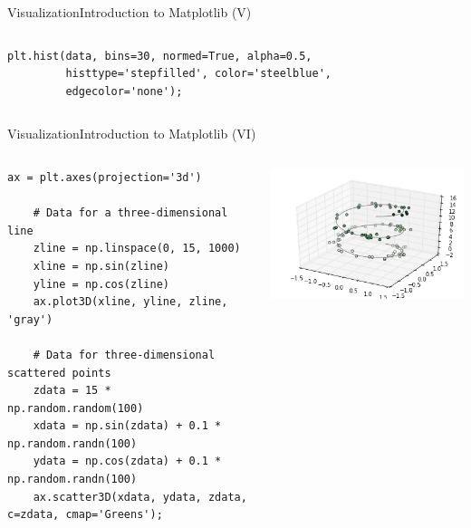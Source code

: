 \documentclass[10pt,compress]{beamer} %
\begin{document}
\begin{frame}[fragile]{Visualization}{Introduction to Matplotlib (V)}
\begin{columns}
\begin{exampleblock}{}
\begin{lstlisting}[basicstyle=\tiny]
	plt.hist(data, bins=30, normed=True, alpha=0.5,
         histtype='stepfilled', color='steelblue',
         edgecolor='none');
	\end{lstlisting}
	\vspace{-0.2cm} 
	\end{exampleblock}
	\end{columns}
\end{frame}

\begin{frame}[fragile]{Visualization}{Introduction to Matplotlib (VI)}
	\begin{columns}
	\begin{exampleblock}{}
	\vspace{-0.2cm} 
	\begin{lstlisting}[basicstyle=\tiny]
	ax = plt.axes(projection='3d')

	# Data for a three-dimensional line
	zline = np.linspace(0, 15, 1000)
	xline = np.sin(zline)
	yline = np.cos(zline)
	ax.plot3D(xline, yline, zline, 'gray')

	# Data for three-dimensional scattered points
	zdata = 15 * np.random.random(100)
	xdata = np.sin(zdata) + 0.1 * np.random.randn(100)
	ydata = np.cos(zdata) + 0.1 * np.random.randn(100)
	ax.scatter3D(xdata, ydata, zdata, c=zdata, cmap='Greens');
	\end{lstlisting}
	\vspace{-0.2cm} 
	\end{exampleblock}

	\centering \includegraphics[width=\textwidth]{figs/matplotlib-3d.png}\\
	\end{columns}
\end{frame}
\end{document}
